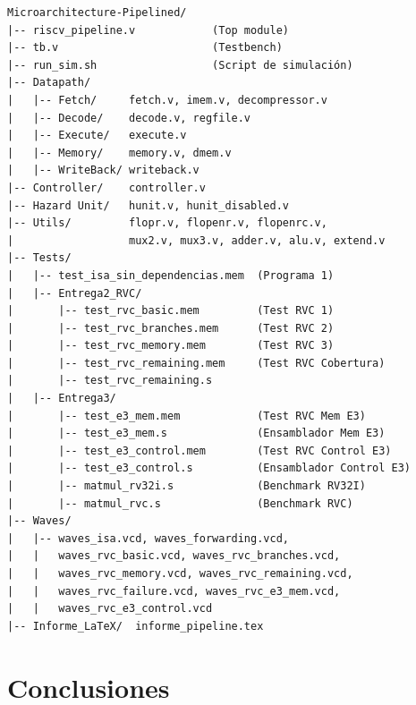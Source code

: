 \documentclass[12pt, a4paper]{article}
\begin{document}
\begin{verbatim}
Microarchitecture-Pipelined/
|-- riscv_pipeline.v            (Top module)
|-- tb.v                        (Testbench)
|-- run_sim.sh                  (Script de simulación)
|-- Datapath/
|   |-- Fetch/     fetch.v, imem.v, decompressor.v
|   |-- Decode/    decode.v, regfile.v
|   |-- Execute/   execute.v
|   |-- Memory/    memory.v, dmem.v
|   |-- WriteBack/ writeback.v
|-- Controller/    controller.v
|-- Hazard Unit/   hunit.v, hunit_disabled.v
|-- Utils/         flopr.v, flopenr.v, flopenrc.v,
|                  mux2.v, mux3.v, adder.v, alu.v, extend.v
|-- Tests/
|   |-- test_isa_sin_dependencias.mem  (Programa 1)
|   |-- Entrega2_RVC/
|       |-- test_rvc_basic.mem         (Test RVC 1)
|       |-- test_rvc_branches.mem      (Test RVC 2)
|       |-- test_rvc_memory.mem        (Test RVC 3)
|       |-- test_rvc_remaining.mem     (Test RVC Cobertura)
|       |-- test_rvc_remaining.s
|   |-- Entrega3/
|       |-- test_e3_mem.mem            (Test RVC Mem E3)
|       |-- test_e3_mem.s              (Ensamblador Mem E3)
|       |-- test_e3_control.mem        (Test RVC Control E3)
|       |-- test_e3_control.s          (Ensamblador Control E3)
|       |-- matmul_rv32i.s             (Benchmark RV32I)
|       |-- matmul_rvc.s               (Benchmark RVC)
|-- Waves/
|   |-- waves_isa.vcd, waves_forwarding.vcd,
|   |   waves_rvc_basic.vcd, waves_rvc_branches.vcd,
|   |   waves_rvc_memory.vcd, waves_rvc_remaining.vcd,
|   |   waves_rvc_failure.vcd, waves_rvc_e3_mem.vcd,
|   |   waves_rvc_e3_control.vcd
|-- Informe_LaTeX/  informe_pipeline.tex
\end{verbatim}

\section{Conclusiones}
\end{document}
